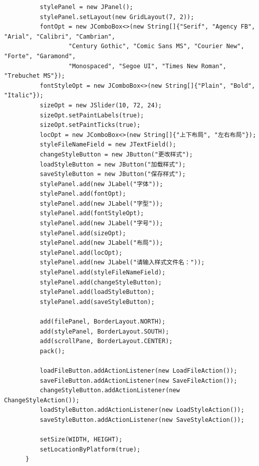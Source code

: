 \documentclass[11pt]{homework}
\begin{document}
\begin{lstlisting}
          stylePanel = new JPanel();
          stylePanel.setLayout(new GridLayout(7, 2));
          fontOpt = new JComboBox<>(new String[]{"Serif", "Agency FB", "Arial", "Calibri", "Cambrian",
                  "Century Gothic", "Comic Sans MS", "Courier New", "Forte", "Garamond",
                  "Monospaced", "Segoe UI", "Times New Roman", "Trebuchet MS"});
          fontStyleOpt = new JComboBox<>(new String[]{"Plain", "Bold", "Italic"});
          sizeOpt = new JSlider(10, 72, 24);
          sizeOpt.setPaintLabels(true);
          sizeOpt.setPaintTicks(true);
          locOpt = new JComboBox<>(new String[]{"上下布局", "左右布局"});
          styleFileNameField = new JTextField();
          changeStyleButton = new JButton("更改样式");
          loadStyleButton = new JButton("加载样式");
          saveStyleButton = new JButton("保存样式");
          stylePanel.add(new JLabel("字体"));
          stylePanel.add(fontOpt);
          stylePanel.add(new JLabel("字型"));
          stylePanel.add(fontStyleOpt);
          stylePanel.add(new JLabel("字号"));
          stylePanel.add(sizeOpt);
          stylePanel.add(new JLabel("布局"));
          stylePanel.add(locOpt);
          stylePanel.add(new JLabel("请输入样式文件名："));
          stylePanel.add(styleFileNameField);
          stylePanel.add(changeStyleButton);
          stylePanel.add(loadStyleButton);
          stylePanel.add(saveStyleButton);
  
          add(filePanel, BorderLayout.NORTH);
          add(stylePanel, BorderLayout.SOUTH);
          add(scrollPane, BorderLayout.CENTER);
          pack();
  
          loadFileButton.addActionListener(new LoadFileAction());
          saveFileButton.addActionListener(new SaveFileAction());
          changeStyleButton.addActionListener(new ChangeStyleAction());
          loadStyleButton.addActionListener(new LoadStyleAction());
          saveStyleButton.addActionListener(new SaveStyleAction());
  
          setSize(WIDTH, HEIGHT);
          setLocationByPlatform(true);
      }
  

\end{lstlisting}
\end{document}
